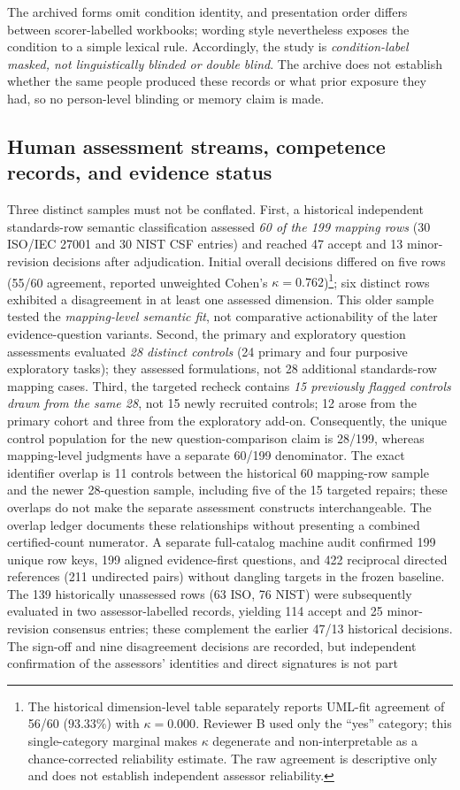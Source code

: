 \documentclass[12pt,a4paper]{article}
\begin{document}
The archived forms omit condition identity, and presentation order differs between scorer-labelled workbooks; wording style nevertheless exposes the condition to a simple lexical rule. Accordingly, the study is \emph{condition-label masked, not linguistically blinded or double blind}. The archive does not establish whether the same people produced these records or what prior exposure they had, so no person-level blinding or memory claim is made.


\subsection{Human assessment streams, competence records, and evidence status}
\label{sec:humanprovenance}
Three distinct samples must not be conflated. First, a historical independent standards-row semantic classification assessed \emph{60 of the 199 mapping rows} (30 ISO/IEC 27001 and 30 NIST CSF entries) and reached 47 accept and 13 minor-revision decisions after adjudication. Initial overall decisions differed on five rows (55/60 agreement, reported unweighted Cohen's $\kappa=0.762$)\footnote{The historical dimension-level table separately reports UML-fit agreement of 56/60 ($93.33\%$) with $\kappa=0.000$. Reviewer B used only the ``yes'' category; this single-category marginal makes $\kappa$ degenerate and non-interpretable as a chance-corrected reliability estimate. The raw agreement is descriptive only and does not establish independent assessor reliability.}; six distinct rows exhibited a disagreement in at least one assessed dimension. This older sample tested the \emph{mapping-level semantic fit}, not comparative actionability of the later evidence-question variants. Second, the primary and exploratory question assessments evaluated \emph{28 distinct controls} (24 primary and four purposive exploratory tasks); they assessed formulations, not 28 additional standards-row mapping cases. Third, the targeted recheck contains \emph{15 previously flagged controls drawn from the same 28}, not 15 newly recruited controls; 12 arose from the primary cohort and three from the exploratory add-on. Consequently, the unique control population for the new question-comparison claim is 28/199, whereas mapping-level judgments have a separate 60/199 denominator. The exact identifier overlap is 11 controls between the historical 60 mapping-row sample and the newer 28-question sample, including five of the 15 targeted repairs; these overlaps do not make the separate assessment constructs interchangeable. The overlap ledger documents these relationships without presenting a combined certified-count numerator. A separate full-catalog machine audit confirmed 199 unique row keys, 199 aligned evidence-first questions, and 422 reciprocal directed references (211 undirected pairs) without dangling targets in the frozen baseline. The 139 historically unassessed rows (63 ISO, 76 NIST) were subsequently evaluated in two assessor-labelled records, yielding 114 accept and 25 minor-revision consensus entries; these complement the earlier 47/13 historical decisions. The sign-off and nine disagreement decisions are recorded, but independent confirmation of the assessors' identities and direct signatures is not part 
\end{document}
